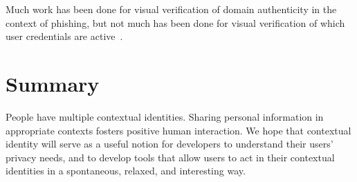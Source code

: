 \documentclass[10pt, conference, compsocconf]{IEEEtran}
\begin{document}
Much work has been done for visual verification of domain authenticity in the
context of phishing, but not much has been done for visual verification of
which user credentials are active~\cite{skins}.

\section{Summary}
People have multiple contextual identities. Sharing personal information in
appropriate contexts fosters positive human interaction.  We hope that
contextual identity will serve as a useful notion for developers to understand
their users' privacy needs, and to develop tools that allow users to act in
their contextual identities in a spontaneous, relaxed, and interesting way.

\begin{comment}
\section{Acknowledgements}
The authors thank
Lucas Adamski
Ben Adida
Mike Connor
Ed Lee
\end{comment}



\end{document}

